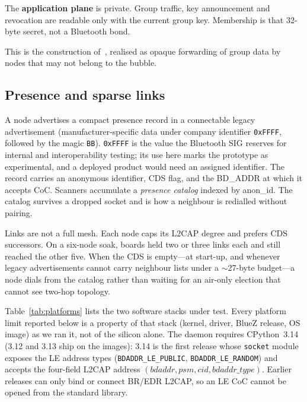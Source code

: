 \documentclass[conference,10pt]{IEEEtran}
\begin{document}
The \textbf{application plane} is private. Group traffic, key
announcement and revocation are readable only with the current group
key. Membership is that 32-byte secret, not a Bluetooth bond.

This is the construction of~\cite{achir2025bb}, realised as opaque
forwarding of group data by nodes that may not belong to the bubble.

\subsection{Presence and sparse links}

A node advertises a compact presence record in a connectable legacy
advertisement (manufacturer-specific data under company identifier
\texttt{0xFFFF}, followed by the magic \texttt{BB}). \texttt{0xFFFF} is
the value the Bluetooth SIG reserves for internal and interoperability
testing; its use here marks the prototype as experimental, and a
deployed product would need an assigned identifier. The record carries an
anonymous identifier, CDS flag, and the BD\_ADDR at which it accepts CoC. Scanners
accumulate a \emph{presence catalog} indexed by anon\_id. The catalog
survives a dropped socket and is how a neighbour is redialled without
pairing.

Links are not a full mesh. Each node caps its L2CAP degree and prefers
CDS successors. On a six-node soak, boards held two or three links each
and still reached the other five. When the CDS is empty---at start-up, and
whenever legacy advertisements cannot carry neighbour lists under a
$\sim$27-byte budget---a node dials from the catalog rather than waiting
for an air-only election that cannot see two-hop topology.

Table~\ref{tab:platforms} lists the two software stacks under test. Every
platform limit reported below is a property of that stack (kernel,
driver, BlueZ release, OS image) as we ran it, not of the silicon alone.
The daemon requires CPython~3.14 (3.12 and 3.13 ship on the images):
3.14 is the first release whose \texttt{socket} module exposes the LE
address types (\texttt{BDADDR\_LE\_PUBLIC}, \texttt{BDADDR\_LE\_RANDOM})
and accepts the four-field L2CAP address
$(\mathit{bdaddr},\mathit{psm},\mathit{cid},\mathit{bdaddr\_type})$.
Earlier releases can only bind or connect BR/EDR L2CAP, so an LE CoC
cannot be opened from the standard library.
\end{document}
